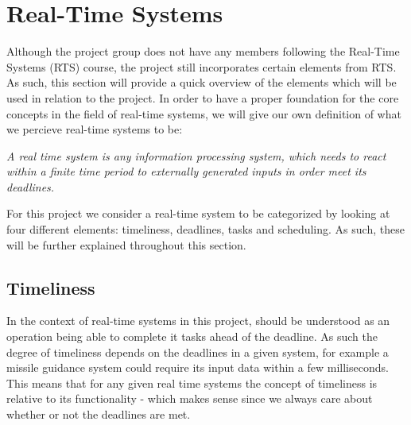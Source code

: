 \section{Real-Time Systems}
Although the project group does not have any members following the Real-Time
Systems (RTS) course, the project still incorporates certain elements from RTS.
As such, this section will provide a quick overview of the elements which will
be used in relation to the project.
In order to have a proper foundation for the core concepts in the field of
real-time systems, we will give our own definition of what we percieve real-time
systems to be:

\begin{center}
\begin{minipage}{0.8\linewidth}
\textit{A real time system is any information processing system, which needs to
react within a finite time period to externally generated inputs in order meet
its deadlines.}
\end{minipage}
\end{center}

For this project we consider a real-time system to be categorized by looking at
four different elements: timeliness, deadlines, tasks and scheduling. As such,
these will be further explained throughout this section.

\subsection{Timeliness}

In the context of real-time systems in this project,  should be understood as an operation being able to complete
it tasks ahead of the deadline. As such the degree of timeliness depends on the deadlines in a given system, for example a
missile guidance system could require its input data within a few milliseconds.
This means that for any given real time systems the concept of timeliness is
relative to its functionality - which makes sense since we always care about
whether or not the deadlines are met.


